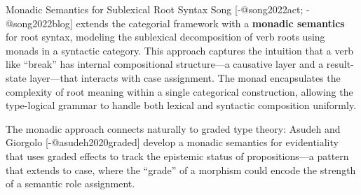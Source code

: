 \documentclass[
  ignorenonframetext,
]{beamer}
\begin{document}
\begin{frame}{Monadic Semantics for Sublexical Root Syntax}
\protect{}\label{monadic-semantics-for-sublexical-root-syntax}
Song {[}-@song2022act; -@song2022blog{]} extends the categorial
framework with a \textbf{monadic semantics} for root syntax, modeling
the sublexical decomposition of verb roots using monads in a syntactic
category. This approach captures the intuition that a verb like
``break'' has internal compositional structure---a causative layer and a
result-state layer---that interacts with case assignment. The monad
encapsulates the complexity of root meaning within a single categorical
construction, allowing the type-logical grammar to handle both lexical
and syntactic composition uniformly.

The monadic approach connects naturally to graded type theory: Asudeh
and Giorgolo {[}-@asudeh2020graded{]} develop a monadic semantics for
evidentiality that uses graded effects to track the epistemic status of
propositions---a pattern that extends to case, where the ``grade'' of a
morphism could encode the strength of a semantic role assignment.
\end{frame}
\end{document}
